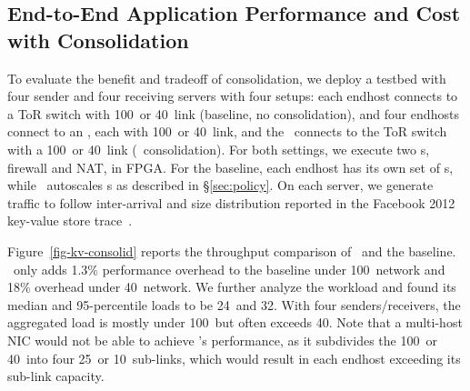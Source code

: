 

\subsection{End-to-End Application Performance and Cost with Consolidation}

To evaluate the benefit and tradeoff of consolidation, we deploy a testbed with four sender and four receiving servers with four setups:
each endhost connects to a ToR switch with 100\Gbps\ or 40\Gbps\ link (baseline, no consolidation), and four endhosts connect to an \snic, each with 100\Gbps\ or 40\Gbps\ link, and the \snic\ connects to the ToR switch with a 100\Gbps\ or 40\Gbps\ link (\snic\ consolidation).
For both settings, we execute two \nt{}s, firewall and NAT, in FPGA. 
For the baseline, each endhost has its own set of \nt{}s, while %
\snic\ autoscales \nt{}s as described in \S\ref{sec:policy}.
On each server, we generate traffic to follow inter-arrival and size distribution reported in the Facebook 2012 key-value store trace~\cite{Atikoglu12-SIGMETRICS}.

Figure~\ref{fig-kv-consolid} reports the throughput comparison of \snic\ and the baseline.
\snic\ only adds 1.3\% performance overhead to the baseline under 100\Gbps\ network and 18\% overhead under 40\Gbps\ network. 
We further analyze the workload and found its median and 95-percentile loads to be 24\Gbps\ and 32\Gbps.
With four senders/receivers, the aggregated load is mostly under 100\Gbps\ but often exceeds 40\Gbps.
Note that a multi-host NIC would not be able to achieve \snic's performance, as it subdivides the 100\Gbps\ or 40\Gbps\ into four 25\Gbps\ or 10\Gbps\ sub-links, which would result in each endhost exceeding its sub-link capacity.


